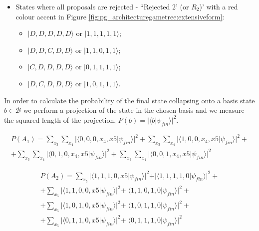 \begin{itemize}
\begin{itemize}
\end{itemize}
\item States where all proposals are rejected  - ``Rejected 2' (or $R_{2}$)' with a red colour accent in Figure \ref{fig:pg_architecturegametree:extensiveform}:
\begin{itemize}
\item $\vert D,D,D,D,D\rangle$ or $\vert1,1,1,1,1\rangle$;
\item $\vert D,D,C,D,D\rangle$ or $\vert1,1,0,1,1\rangle$;
\item $\vert C,D,D,D,D\rangle$ or $\vert0,1,1,1,1\rangle$;
\item $\vert D,C,D,D,D\rangle$ or $\vert1,0,1,1,1\rangle$.
\end{itemize}
\end{itemize}

In order to calculate the probability of the final state collapsing onto a basis state $b \in \mathcal{B}$ we perform a projection of the state in the chosen basis and we measure the squared length of the projection, $P(b) = \vert\langle b\vert\psi_{fin}\rangle\vert^{2}$\cite{Trueblood}.


\begin{equation}
\begin{split}
P(A_{1}) = \sum_{x_{3}}\sum_{x_{4}}\vert\langle0,0,0,x_{4},x{5}\vert\psi_{fin}\rangle\vert^{2} + \sum_{x_{3}}\sum_{x_{4}}\vert\langle1,0,0,x_{4},x{5}\vert\psi_{fin}\rangle\vert^{2} + \\ 
+ \sum_{x_{3}}\sum_{x_{4}}\vert\langle0,1,0,x_{4},x{5}\vert\psi_{fin}\rangle\vert^{2}
+ \sum_{x_{3}}\sum_{x_{4}}\vert\langle0,0,1,x_{4},x{5}\vert\psi_{fin}\rangle\vert^{2}
\end{split}
\end{equation}

\begin{equation}
\begin{split}
P(A_{2}) = \sum_{x_{5}}\vert\langle1,1,1,0,x{5}\vert\psi_{fin}\rangle\vert^{2} + \vert\langle1,1,1,1,0\vert\psi_{fin}\rangle\vert^{2} + \\ + \sum_{x_{5}}\vert\langle1,1,0,0,x{5}\vert\psi_{fin}\rangle\vert^{2}+ \vert\langle1,1,0,1,0\vert\psi_{fin}\rangle\vert^{2} + \\ 
+ \sum_{x_{5}}\vert\langle1,0,1,0,x{5}\vert\psi_{fin}\rangle\vert^{2} + \vert\langle1,0,1,1,0\vert\psi_{fin}\rangle\vert^{2}
+ \\ + \sum_{x_{5}}\vert\langle0,1,1,0,x{5}\vert\psi_{fin}\rangle\vert^{2} + \vert\langle0,1,1,1,0\vert\psi_{fin}\rangle\vert^{2}
\end{split}
\end{equation}

